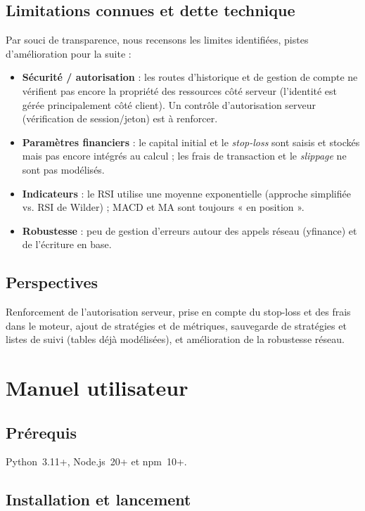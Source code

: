 \documentclass[11pt,a4paper]{article}
\begin{document}
\subsection{Limitations connues et dette technique}
Par souci de transparence, nous recensons les limites identifiées, pistes
d'amélioration pour la suite :
\begin{itemize}[leftmargin=1.4em]
  \item \textbf{Sécurité / autorisation} : les routes d'historique et de gestion de
        compte ne vérifient pas encore la propriété des ressources côté serveur
        (l'identité est gérée principalement côté client). Un contrôle
        d'autorisation serveur (vérification de session/jeton) est à renforcer.
  \item \textbf{Paramètres financiers} : le capital initial et le \emph{stop-loss}
        sont saisis et stockés mais pas encore intégrés au calcul ; les frais de
        transaction et le \emph{slippage} ne sont pas modélisés.
  \item \textbf{Indicateurs} : le RSI utilise une moyenne exponentielle (approche
        simplifiée vs. RSI de Wilder) ; MACD et MA sont toujours « en position ».
  \item \textbf{Robustesse} : peu de gestion d'erreurs autour des appels réseau
        (yfinance) et de l'écriture en base.
\end{itemize}

\subsection{Perspectives}
Renforcement de l'autorisation serveur, prise en compte du stop-loss et des frais
dans le moteur, ajout de stratégies et de métriques, sauvegarde de stratégies et
listes de suivi (tables déjà modélisées), et amélioration de la robustesse réseau.

\section{Manuel utilisateur}
\subsection{Prérequis}
Python~3.11+, Node.js~20+ et npm~10+.

\subsection{Installation et lancement}
\end{document}
